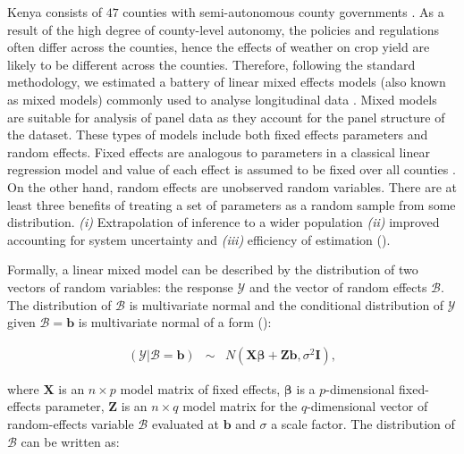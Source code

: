 \documentclass[a4paper,12pt]{article}
\begin{document}
\sloppy
Kenya consists of $47$ counties with semi-autonomous county governments  \citep{Barasa2017}. As a result of the high degree of county-level autonomy, the policies and regulations often differ across the counties, hence the effects of weather on crop yield are likely to be different across the counties. Therefore, following the standard methodology, we estimated a battery of linear mixed effects models (also known as mixed models) commonly used to analyse longitudinal data \citep{bates2000mixed}. Mixed models are suitable for analysis of panel data as they account for the panel structure of the dataset. These types of models include both fixed effects parameters and random effects. Fixed effects are analogous to parameters in a classical linear regression model and value of each effect is assumed to be fixed over all counties \citep{bates2010lme4}. On the other hand, random effects are unobserved random variables. There are at least three benefits of treating a set of parameters as a random sample from some distribution. \textit{(i)} Extrapolation of inference to a wider population \textit{(ii)} improved accounting for system uncertainty and \textit{(iii)} efficiency of estimation (\citealp{KERYch9, KERYch12}).

Formally, a linear mixed model can be described by the distribution of two vectors of random variables: the response $\mathscr{Y}$ and the vector of random effects $\mathscr{B}$. The distribution of $\mathscr{B}$ is multivariate normal and the conditional distribution of $\mathscr{Y}$ given $\mathscr{B}=\mathbf{b}$ is multivariate normal of a form (\citealp{bates2010lme4, KERYch9}):




\begin{equation}\label{MixedGeneral}
\begin{array}{lcl}

(\mathscr{Y}|\mathscr{B}=\mathbf{b})& \sim & \mathit{N}(\mathbf{X}\mathbf{\beta}+\mathbf{Z}\mathbf{b},\sigma^2\mathbf{I}),

\end{array}
\end{equation}

where $\mathbf{X}$ is an $n \times p$ model matrix of fixed effects, $\mathbf{\beta}$ is a $p$-dimensional fixed-effects parameter, $\mathbf{Z}$ is an $n \times q$ model matrix for the $q$-dimensional vector of random-effects variable $\mathscr{B}$ evaluated at $\mathbf{b}$ and $\sigma$ a scale factor. The distribution of $\mathscr{B}$ can be written as: 
\end{document}
